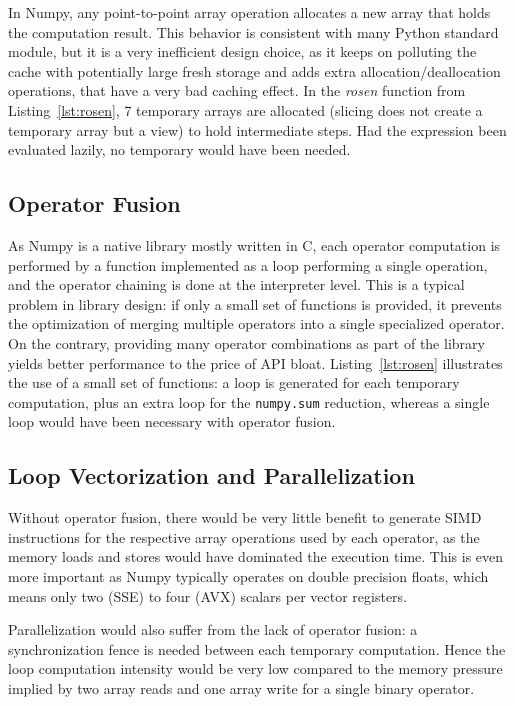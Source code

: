 \documentclass[10pt, preprint, nocopyrightspace]{sigplanconf}
\begin{document}
In Numpy, any point-to-point array operation allocates a new array that holds
the computation result. This behavior is consistent with many Python standard
module, but it is a very inefficient design choice, as it keeps on polluting
the cache with potentially large fresh storage and adds extra
allocation/deallocation operations, that have a very bad caching effect. In the
\textit{rosen} function from Listing~\ref{lst:rosen}, 7 temporary arrays are
allocated (slicing does not create a temporary array but a view) to hold
intermediate steps. Had the expression been evaluated lazily, no temporary
would have been needed.

\subsection{Operator Fusion}
\label{sec:operator-fusion}

As Numpy is a native library mostly written in C, each operator computation is
performed by a function implemented as a loop performing a single operation,
and the operator chaining is done at the interpreter level. This is a typical
problem in library design: if only a small set of functions is provided, it
prevents the optimization of merging multiple operators into a single specialized
operator. On the contrary, providing many operator combinations as part of the library yields
better performance to the price of API bloat. Listing~\ref{lst:rosen}
illustrates the use of a small set of functions: a loop is generated for
each temporary computation, plus an extra loop for the \texttt{numpy.sum}
reduction, whereas a single loop would have been necessary with operator fusion.

\subsection{Loop Vectorization and Parallelization}

Without operator fusion, there would be very little benefit to generate SIMD
instructions for the respective array operations used by each operator, as the
memory loads and stores would have dominated the execution time. This is even more important as
Numpy typically operates on double precision floats, which means only two (SSE)
to four (AVX) scalars per vector registers.

Parallelization would also suffer from the lack of operator fusion: a
synchronization fence is needed between each temporary computation.  Hence the
loop computation intensity would be very low compared to the memory pressure
implied by two array reads and one array write for a single binary operator.
\end{document}
